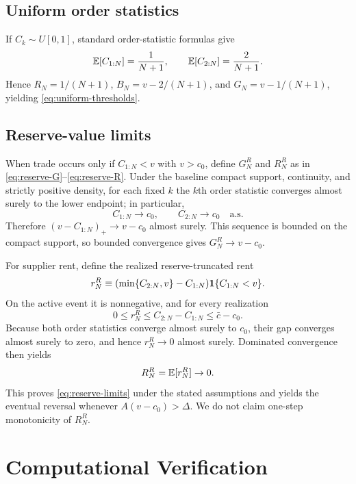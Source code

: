 \subsection{Uniform order statistics}

If $C_k\sim U[0,1]$, standard order-statistic formulas give
\begin{equation}
\mathbb{E}[C_{1:N}]=\frac{1}{N+1},
\qquad
\mathbb{E}[C_{2:N}]=\frac{2}{N+1}.
\end{equation}
Hence $R_N=1/(N+1)$, $B_N=v-2/(N+1)$, and $G_N=v-1/(N+1)$, yielding \eqref{eq:uniform-thresholds}.

\subsection{Reserve-value limits}

When trade occurs only if $C_{1:N}<v$ with $v>c_0$, define $G_N^R$ and $R_N^R$ as in \eqref{eq:reserve-G}--\eqref{eq:reserve-R}. Under the baseline compact support, continuity, and strictly positive density, for each fixed $k$ the $k$th order statistic converges almost surely to the lower endpoint; in particular,
\begin{equation}
C_{1:N}\to c_0,
\qquad
C_{2:N}\to c_0
\quad\text{a.s.}
\end{equation}
Therefore $(v-C_{1:N})_+\to v-c_0$ almost surely. This sequence is bounded on the compact support, so bounded convergence gives $G_N^R\to v-c_0$.

For supplier rent, define the realized reserve-truncated rent
\begin{equation}
r_N^R\equiv
(\min\{C_{2:N},v\}-C_{1:N})
\mathbf{1}\{C_{1:N}<v\}.
\end{equation}
On the active event it is nonnegative, and for every realization
\begin{equation}
0\le r_N^R\le C_{2:N}-C_{1:N}\le \bar c-c_0.
\end{equation}
Because both order statistics converge almost surely to $c_0$, their gap converges almost surely to zero, and hence $r_N^R\to0$ almost surely. Dominated convergence then yields
\begin{equation}
R_N^R=\mathbb{E}[r_N^R]\to0.
\end{equation}
This proves \eqref{eq:reserve-limits} under the stated assumptions and yields the eventual reversal whenever $A(v-c_0)>\Delta$. We do not claim one-step monotonicity of $R_N^R$.

\section{Computational Verification}
\label{app:verification}

